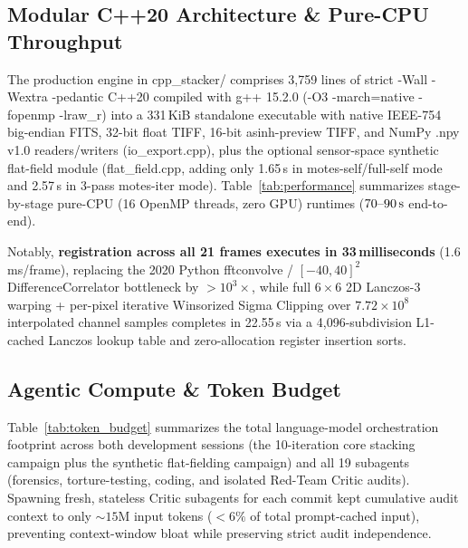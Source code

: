 \documentclass[10pt,twocolumn,letterpaper]{article}
\DeclareRobustCommand{\code}[1]{\texttt{#1}}
\def\code#1{#1}%
\begin{document}
\subsection{Modular C++20 Architecture \& Pure-CPU Throughput}

The production engine in \code{cpp\_stacker/} comprises \code{3,759} lines of strict \code{-Wall -Wextra -pedantic} C++20 compiled with \code{g++ 15.2.0} (\code{-O3 -march=native -fopenmp -lraw\_r}) into a \code{331\,KiB} standalone executable with native IEEE-754 big-endian FITS, 32-bit float TIFF, 16-bit \code{asinh}-preview TIFF, and NumPy \code{.npy} v1.0 readers/writers (\code{io\_export.cpp}), plus the optional sensor-space synthetic flat-field module (\code{flat\_field.cpp}, adding only \code{1.65\,s} in \code{motes-self}/\code{full-self} mode and \code{2.57\,s} in 3-pass \code{motes-iter} mode). Table~\ref{tab:performance} summarizes stage-by-stage pure-CPU (16 OpenMP threads, zero GPU) runtimes ($70\text{--}90\text{\,s}$ end-to-end).

Notably, \textbf{registration across all 21 frames executes in \code{33\,milliseconds}} (\code{1.6\,ms/frame}), replacing the 2020 Python \code{fftconvolve} / $[-40, 40]^2$ \code{DifferenceCorrelator} bottleneck by $>10^3\times$, while full $6\times 6$ 2D Lanczos-3 warping + per-pixel iterative Winsorized Sigma Clipping over $7.72 \times 10^8$ interpolated channel samples completes in \code{22.55\,s} via a \code{4,096}-subdivision L1-cached Lanczos lookup table and zero-allocation register insertion sorts.

\subsection{Agentic Compute \& Token Budget}

Table~\ref{tab:token_budget} summarizes the total language-model orchestration footprint across both development sessions (the 10-iteration core stacking campaign plus the synthetic flat-fielding campaign) and all 19 subagents (forensics, torture-testing, coding, and isolated Red-Team Critic audits). Spawning fresh, stateless Critic subagents for each commit kept cumulative audit context to only $\sim 15\text{M}$ input tokens ($<6\%$ of total prompt-cached input), preventing context-window bloat while preserving strict audit independence.
\end{document}

